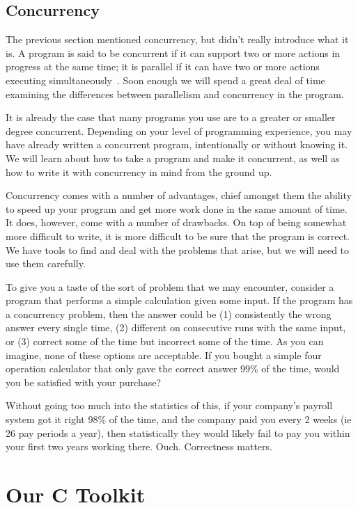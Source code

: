\documentclass[a4paper]{report}
\begin{document}
\subsection*{Concurrency}

The previous section mentioned concurrency, but didn't really introduce what it is. A program is said to be concurrent if it can support two or more actions in progress at the same time; it is parallel if it can have two or more actions executing simultaneously~\cite{artofc}. Soon enough we will spend a great deal of time examining the differences between parallelism and concurrency in the program.

It is already the case that many programs you use are to a greater or smaller degree concurrent. Depending on your level of programming experience, you may have already written a concurrent program, intentionally or without knowing it. We will learn about how to take a program and make it concurrent, as well as how to write it with concurrency in mind from the ground up.

Concurrency comes with a number of advantages, chief amongst them the ability to speed up your program and get more work done in the same amount of time. It does, however, come with a number of drawbacks. On top of being somewhat more difficult to write, it is more difficult to be sure that the program is correct. We have tools to find and deal with the problems that arise, but we will need to use them carefully.

To give you a taste of the sort of problem that we may encounter, consider a program that performs a simple calculation given some input. If the program has a concurrency problem,  then the answer could be (1) consistently the wrong answer every single time, (2) different on consecutive runs with the same input, or (3) correct some of the time but incorrect some of the time. As you can imagine, none of these options are acceptable. If you bought a simple four operation calculator that only gave the correct answer 99\% of the time, would you be satisfied with your purchase?

Without going too much into the statistics of this, if your company's payroll system got it right 98\% of the time, and the company paid you every 2 weeks (ie 26 pay periods a year), then statistically they would likely fail to pay you  within your first two years working there. Ouch. Correctness matters.

\section*{Our C Toolkit}
\end{document}
